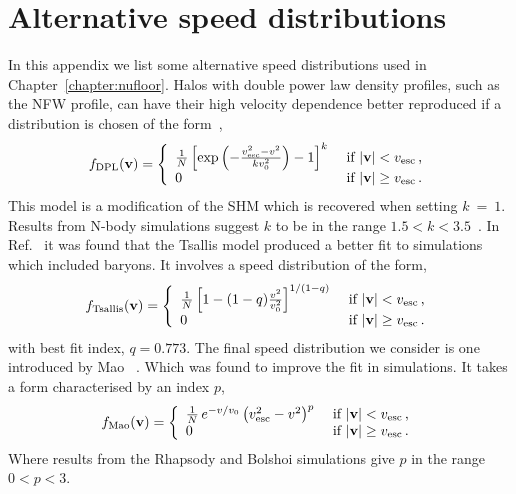 \chapter{Alternative speed distributions}\label{app:fv}
In this appendix we list some alternative speed distributions used in Chapter~\ref{chapter:nufloor}. Halos with double power law density profiles, such as the NFW profile, can have their high velocity dependence better reproduced if a distribution is chosen of the form~\cite{Stadel:2008pn},
\begin{equation}
f_{\rm DPL}({\bf v}) = \left\{
\begin{array}{llrr}
 \frac{1}{N}\left[\exp{\left(-\frac{v_{\rm esc}^2-v^2}{kv_0^2}\right)}-1\right]^k &	\ \text{if $|{\bf v}|<v_{\rm esc}$\,,}  \\
0   		& 	\ \text{if $|{\bf v}|\geq v_{\rm esc}$\,.}
\end{array}\right.
\end{equation}
This model is a modification of the SHM which is recovered when setting $k~=~1$. Results from N-body simulations suggest $k$ to be in the range $1.5<k<3.5$~\cite{Busha:2004uk,Lisanti:2010qx}. In Ref.~\cite{Ling:2009eh} it was found that the Tsallis model produced a better fit to simulations which included baryons. It involves a speed distribution of the form, 
\begin{equation}
f_{\rm Tsallis}({\bf v}) = \left\{
\begin{array}{llrr}
 \frac{1}{N}\left[1-(1-q)\frac{v^2}{v_0^2}\right]^{1/(1-q)} &	\ \text{if $|{\bf v}|<\vesc$\,,}  \\
 0  		& 	\ \text{if $|{\bf v}|\geq \vesc$\,.}
\end{array}\right.
\end{equation}
with best fit index, $q = 0.773$. The final speed distribution we consider is one introduced by Mao \etal~\cite{Mao:2012hf,Mao:2013nda}. Which was found to improve the fit in simulations. It takes a form characterised by an index $p$,
\begin{equation}
f_{\rm Mao}({\bf v}) = \left\{
\begin{array}{llrr}
 \frac{1}{N}\,e^{-v/v_0}\left(v_{\rm esc}^2-v^2\right)^p &	\ \text{if $|{\bf v}|<v_{\rm esc}$\,,}  \\
0   		& 	\ \text{if $|{\bf v}|\geq v_{\rm esc}$\,.}
\end{array}\right.
\end{equation}
Where results from the Rhapsody and Bolshoi simulations give $p$ in the range $0<p<3$.
